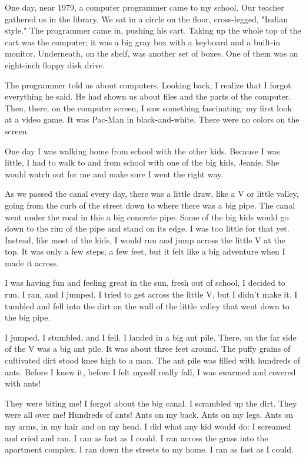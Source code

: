 One day, near 1979, a computer programmer came to my school.  Our teacher gathered us in the library.  We sat in a circle on the floor, cross-legged, "Indian style."  The programmer came in, pushing his cart.  Taking up the whole top of the cart was the computer; it was a big gray box with a keyboard and a built-in monitor.  Underneath, on the shelf, was another set of boxes.  One of them was an eight-inch floppy disk drive.

The programmer told us about computers.  Looking back, I realize that I forgot everything he said. He had shown us about files and the parts of the computer.  Then, there, on the computer screen, I saw something fascinating:  my first look at a video game.  It was Pac-Man in black-and-white.  There were no colors on the screen.

One day I was walking home from school with the other kids.  Because I was little, I had to walk to and from school with one of the big kids, Jeanie.  She would watch out for me and make sure I went the right way.

As we passed the canal every day, there was a little draw, like a V or little valley, going from the curb of the street down to where there was a big pipe.  The canal went under the road in this a big concrete pipe.  Some of the big kids would go down to the rim of the pipe and stand on its edge.  I was too little for that yet.  Instead, like most of the kids, I would run and jump across the little V at the top.  It was only a few steps, a few feet, but it felt like a big adventure when I made it across.

I was having fun and feeling great in the sun, fresh out of school, I decided to run.  I ran, and I jumped.  I tried to get across the little V, but I didn't make it.  I tumbled and fell into the dirt on the wall of the little valley that went down to the big pipe.

I jumped. I stumbled, and I fell.  I landed in a big ant pile.  There, on the far side of the V was a big ant pile.  It was about three feet around.  The puffy grains of cultivated dirt stood knee high to a man.  The ant pile was filled with hundreds of ants.  Before I knew it, before I felt myself really fall, I was swarmed and covered with ants!

They were biting me! I forgot about the big canal.  I scrambled up the dirt.  They were all over me!  Hundreds of ants!  Ants on my back. Ants on my legs.  Ants on my arms, in my hair and on my head.  I did what any kid would do:  I screamed and cried and ran.  I ran as fast as I could.  I ran across the grass into the apartment complex.  I ran down the streets to my home.  I ran as fast as I could.

